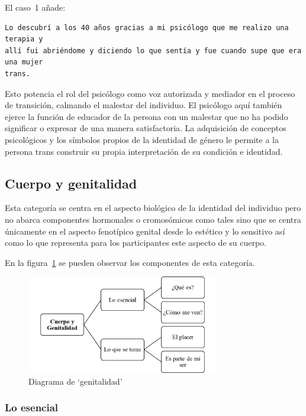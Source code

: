 El caso~1 añade:

\begin{verbatim}
Lo descubrí a los 40 años gracias a mi psicólogo que me realizo una terapia y
allí fui abriéndome y diciendo lo que sentía y fue cuando supe que era una mujer
trans.
\end{verbatim}

Esto potencia el rol del psicólogo como voz autorizada y mediador en el proceso
de transición, calmando el malestar del individuo. El psicólogo aquí también
ejerce la función de educador de la persona con un malestar que no ha podido
significar o expresar de una manera satisfactoria. La adquisición de conceptos
psicológicos y los símbolos propios de la identidad de género le permite a la
persona trans construir su propia interpretación de su condición e identidad.

\subsection{Cuerpo y genitalidad}

Esta categoría se centra en el aspecto biológico de la identidad del individuo
pero no abarca componentes hormonales o cromosómicos como tales sino que se
centra únicamente en el aspecto fenotípico genital desde lo estético y lo
sensitivo así como lo que representa para los participantes este aspecto de su
cuerpo.

En la figura~\ref{fig:genitalidad} se pueden observar los componentes de esta
categoría.

\begin{figure}
    \centering
    \includegraphics[width=0.75\textwidth]{genitalidad}
    \caption{Diagrama de ‘genitalidad’}\label{fig:genitalidad}
\end{figure}

\subsubsection{Lo esencial}

